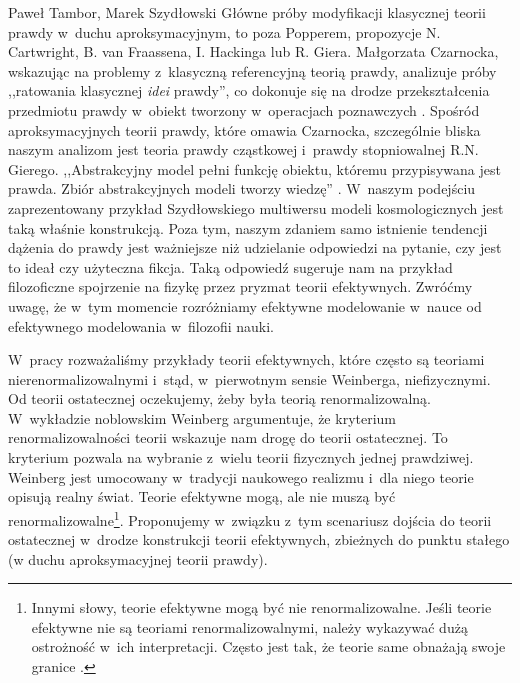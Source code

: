 \begin{artplenv2auth}{Paweł Tambor, Marek Szydłowski}
Główne próby modyfikacji klasycznej teorii prawdy w~duchu aproksymacyjnym, to poza Popperem, propozycje N. Cartwright, B. van Fraassena, I. Hackinga lub R. Giera. Małgorzata Czarnocka, wskazując na problemy z~klasyczną referencyjną teorią prawdy, analizuje próby ,,ratowania klasycznej \textit{idei} prawdy'', co dokonuje się na drodze przekształcenia przedmiotu prawdy w~obiekt tworzony w~operacjach poznawczych
\parencite[][s.~104]{czarnocka_modyfikacje_1996}. %
 Spośród aproksymacyjnych teorii prawdy, które omawia Czarnocka, szczególnie bliska naszym analizom jest teoria prawdy cząstkowej i~prawdy stopniowalnej R.N. Gierego. ,,Abstrakcyjny model pełni funkcję obiektu, któremu przypisywana jest prawda. Zbiór abstrakcyjnych modeli tworzy wiedzę'' 
\parencite[][s.~110]{czarnocka_modyfikacje_1996}. %
 W~naszym podejściu zaprezentowany przykład Szydłowskiego multiwersu modeli kosmologicznych jest taką właśnie konstrukcją. Poza tym, naszym zdaniem samo istnienie tendencji dążenia do prawdy jest ważniejsze niż udzielanie odpowiedzi na pytanie, czy jest to ideał czy użyteczna fikcja. Taką odpowiedź sugeruje nam na przykład filozoficzne spojrzenie na fizykę przez pryzmat teorii efektywnych. Zwróćmy uwagę, że w~tym momencie rozróżniamy efektywne modelowanie w~nauce od efektywnego modelowania w~filozofii nauki.

W~pracy rozważaliśmy przykłady teorii efektywnych, które często są teoriami nierenormalizowalnymi i~stąd, w~pierwotnym sensie Weinberga, niefizycznymi. Od teorii ostatecznej oczekujemy, żeby była teorią renormalizowalną. W~wykładzie noblowskim Weinberg argumentuje, że kryterium renormalizowalności teorii wskazuje nam drogę do teorii ostatecznej. To kryterium pozwala na wybranie z~wielu teorii fizycznych jednej prawdziwej. Weinberg jest umocowany w~tradycji naukowego realizmu i~dla niego teorie opisują realny świat. Teorie efektywne mogą, ale nie muszą być renormalizowalne\footnote{Innymi słowy, teorie efektywne mogą być nie renormalizowalne. Jeśli teorie efektywne nie są teoriami renormalizowalnymi, należy wykazywać dużą ostrożność w~ich interpretacji. Często jest tak, że teorie same obnażają swoje granice
\parencites[][]{golbiak_kosmologia_2005}[][]{butryn_czy_2011}.%
}. Proponujemy w~związku z~tym scenariusz dojścia do teorii ostatecznej w~drodze konstrukcji teorii efektywnych, zbieżnych do punktu stałego (w duchu aproksymacyjnej teorii prawdy).


\end{artplenv2auth}

